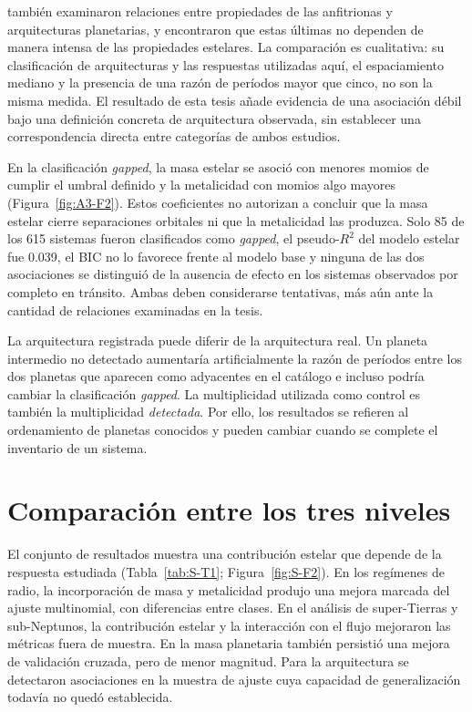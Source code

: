 \textcite{howe2026} también examinaron relaciones entre propiedades de las anfitrionas y arquitecturas planetarias, y encontraron que estas últimas no dependen de manera intensa de las propiedades estelares. La comparación es cualitativa: su clasificación de arquitecturas y las respuestas utilizadas aquí, el espaciamiento mediano y la presencia de una razón de períodos mayor que cinco, no son la misma medida. El resultado de esta tesis añade evidencia de una asociación débil bajo una definición concreta de arquitectura observada, sin establecer una correspondencia directa entre categorías de ambos estudios.

En la clasificación \textit{gapped}, la masa estelar se asoció con menores momios de cumplir el umbral definido y la metalicidad con momios algo mayores (Figura~\ref{fig:A3-F2}). Estos coeficientes no autorizan a concluir que la masa estelar cierre separaciones orbitales ni que la metalicidad las produzca. Solo 85 de los 615 sistemas fueron clasificados como \textit{gapped}, el pseudo-$R^2$ del modelo estelar fue 0.039, el BIC no lo favorece frente al modelo base y ninguna de las dos asociaciones se distinguió de la ausencia de efecto en los sistemas observados por completo en tránsito. Ambas deben considerarse tentativas, más aún ante la cantidad de relaciones examinadas en la tesis.

La arquitectura registrada puede diferir de la arquitectura real. Un planeta intermedio no detectado aumentaría artificialmente la razón de períodos entre los dos planetas que aparecen como adyacentes en el catálogo e incluso podría cambiar la clasificación \textit{gapped}. La multiplicidad utilizada como control es también la multiplicidad \emph{detectada}. Por ello, los resultados se refieren al ordenamiento de planetas conocidos y pueden cambiar cuando se complete el inventario de un sistema.

\section{Comparación entre los tres niveles}
\label{sec:dis-comparacion}

El conjunto de resultados muestra una contribución estelar que depende de la respuesta estudiada (Tabla~\ref{tab:S-T1}; Figura~\ref{fig:S-F2}). En los regímenes de radio, la incorporación de masa y metalicidad produjo una mejora marcada del ajuste multinomial, con diferencias entre clases. En el análisis de super-Tierras y sub-Neptunos, la contribución estelar y la interacción con el flujo mejoraron las métricas fuera de muestra. En la masa planetaria también persistió una mejora de validación cruzada, pero de menor magnitud. Para la arquitectura se detectaron asociaciones en la muestra de ajuste cuya capacidad de generalización todavía no quedó establecida.


